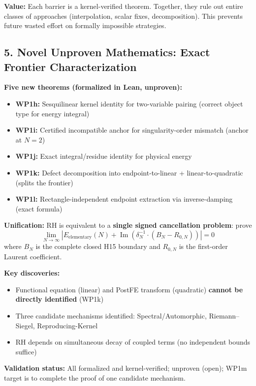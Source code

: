 \documentclass[11pt,a4paper]{article}
\theoremstyle{plain}
\theoremstyle{definition}
\theoremstyle{remark}
\DeclareMathOperator{\ImPart}{Im}
\renewcommand{\Im}{\ImPart}
\begin{document}
\textbf{Value:} Each barrier is a kernel-verified theorem. Together, they rule out entire classes of approaches (interpolation, scalar fixes, decomposition). This prevents future wasted effort on formally impossible strategies.

\subsection{5. Novel Unproven Mathematics: Exact Frontier Characterization}

\textbf{Five new theorems (formalized in Lean, unproven):}

\begin{itemize}[leftmargin=2em]
  \item \textbf{WP1h:} Sesquilinear kernel identity for two-variable pairing (correct object type for energy integral)
  \item \textbf{WP1i:} Certified incompatible anchor for singularity-order mismatch (anchor at $N=2$)
  \item \textbf{WP1j:} Exact integral/residue identity for physical energy
  \item \textbf{WP1k:} Defect decomposition into endpoint-to-linear + linear-to-quadratic (splits the frontier)
  \item \textbf{WP1l:} Rectangle-independent endpoint extraction via inverse-damping (exact formula)
\end{itemize}

\textbf{Unification:} RH is equivalent to a \textbf{single signed cancellation problem}: prove
\[
\lim_{N \to \infty} \left| E_{\mathrm{elementary}}(N) + \Im\left(\delta_N^{-1} \cdot (B_N - R_{0,N})\right) \right| = 0
\]
where $B_N$ is the complete closed H15 boundary and $R_{0,N}$ is the first-order Laurent coefficient.

\textbf{Key discoveries:}
\begin{itemize}[leftmargin=2em]
  \item Functional equation (linear) and PostFE transform (quadratic) \textbf{cannot be directly identified} (WP1k)
  \item Three candidate mechanisms identified: Spectral/Automorphic, Riemann--Siegel, Reproducing-Kernel
  \item RH depends on simultaneous decay of coupled terms (no independent bounds suffice)
\end{itemize}

\textbf{Validation status:} All formalized and kernel-verified; unproven (open); WP1m target is to complete the proof of one candidate mechanism.
\end{document}
